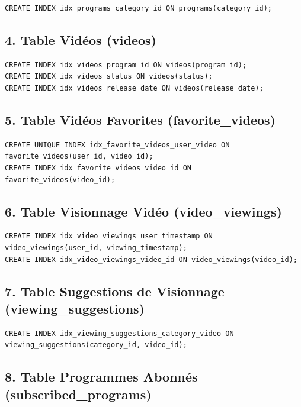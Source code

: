 \documentclass[a4paper, 12pt]{article}
\begin{document}
\begin{lstlisting}
CREATE INDEX idx_programs_category_id ON programs(category_id);
\end{lstlisting}

\subsection*{4. Table Vidéos (videos)}

\begin{lstlisting}
CREATE INDEX idx_videos_program_id ON videos(program_id);
CREATE INDEX idx_videos_status ON videos(status);
CREATE INDEX idx_videos_release_date ON videos(release_date);
\end{lstlisting}

\subsection*{5. Table Vidéos Favorites (favorite\_videos)}

\begin{lstlisting}
CREATE UNIQUE INDEX idx_favorite_videos_user_video ON favorite_videos(user_id, video_id);
CREATE INDEX idx_favorite_videos_video_id ON favorite_videos(video_id);
\end{lstlisting}

\subsection*{6. Table Visionnage Vidéo (video\_viewings)}

\begin{lstlisting}
CREATE INDEX idx_video_viewings_user_timestamp ON video_viewings(user_id, viewing_timestamp);
CREATE INDEX idx_video_viewings_video_id ON video_viewings(video_id);
\end{lstlisting}

\subsection*{7. Table Suggestions de Visionnage (viewing\_suggestions)}

\begin{lstlisting}
CREATE INDEX idx_viewing_suggestions_category_video ON viewing_suggestions(category_id, video_id);
\end{lstlisting}

\subsection*{8. Table Programmes Abonnés (subscribed\_programs)}
\end{document}
